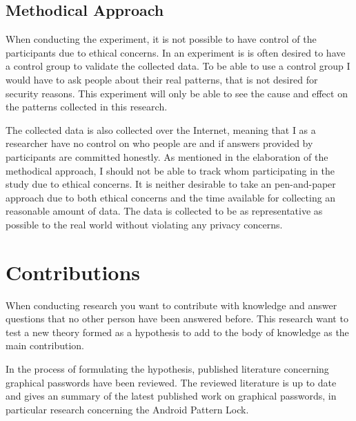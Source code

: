 	  \subsection{Methodical Approach}
	  	When conducting the experiment, it is not possible to have control of the participants due to ethical concerns. In an experiment is is often desired to have a control group to validate the collected data. To be able to use a control group I would have to ask people about their real patterns, that is not desired for security reasons. This experiment will only be able to see the cause and effect on the patterns collected in this research.

	  	The collected data is also collected over the Internet, meaning that I as a researcher have no control on who people are and if answers provided by participants are committed honestly. As mentioned in the elaboration of the methodical approach, I should not be able to track whom participating in the study due to ethical concerns. It is neither desirable to take an pen-and-paper approach due to both ethical concerns and the time available for collecting an reasonable amount of data. The data is collected to be as representative as possible to the real world without violating any privacy concerns. 
	
	\section{Contributions} \label{sec:contributions}

		When conducting research you want to contribute with knowledge and answer questions that no other person have been answered before. This research want to test a new theory formed as a hypothesis to add to the body of knowledge as the main contribution.

		In the process of formulating the hypothesis, published literature concerning graphical passwords have been reviewed. The reviewed literature is up to date and gives an summary of the latest published work on graphical passwords, in particular research concerning the Android Pattern Lock. 

